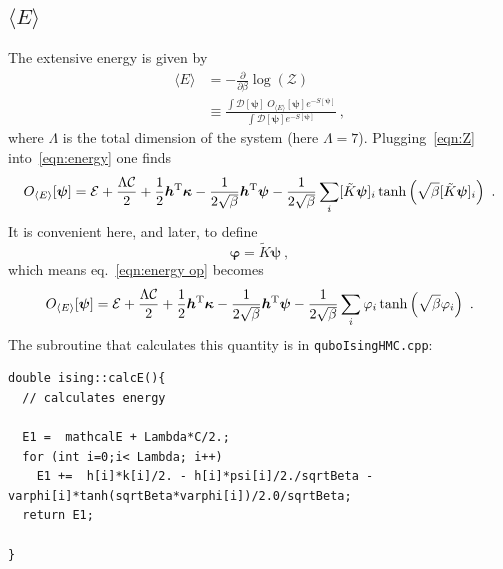 \documentclass[11pt]{article}
\begin{document}
\subsection{$\langle E\rangle$}
The extensive energy is given by
\begin{align}
\langle E\rangle&=-\frac{\partial}{\partial \beta} \log (\mathcal{Z})\label{eqn:energy}\\
&\equiv\frac{\int\mathcal{D}[\bm\psi]\ O_{\langle E\rangle}[\bm\psi]e^{-S[\bm\psi]}}{\int\mathcal{D}[\bm\psi]e^{-S[\bm\psi]}}\ ,
\end{align}
where $\Lambda$ is the total dimension of the system  (here $\Lambda=7$).  Plugging~\eqref{eqn:Z} into~\eqref{eqn:energy} one finds
\begin{equation}\label{eqn:energy op}
O_{\langle E\rangle}[\bm\psi]=\mathcal{E}+\frac{\Lambda\mathcal{C}}{2}
+\frac{1}{2}\bm h^{\rm T}\bm\kappa
-\frac{1}{2\sqrt{\beta}}\bm h^{\rm T}\bm\psi
-\frac{1}{2 \sqrt{\beta}} \sum_{i} [\tilde{K}\bm\psi]_i \tanh \left(\sqrt{\beta} [\tilde{K}\bm\psi]_i\right)\ .
\end{equation}
It is convenient here, and later, to define
\begin{equation}
\bm\varphi = \tilde K\bm \psi\ ,
\end{equation}
which means eq.~\eqref{eqn:energy op} becomes
\begin{equation}\label{eqn:energy op2}
O_{\langle E\rangle}[\bm\psi]=\mathcal{E}+\frac{\Lambda\mathcal{C}}{2}
+\frac{1}{2}\bm h^{\rm T}\bm\kappa
-\frac{1}{2\sqrt{\beta}}\bm h^{\rm T}\bm\psi
-\frac{1}{2 \sqrt{\beta}} \sum_{i} \varphi_i \tanh \left(\sqrt{\beta} \varphi_i\right)\ .
\end{equation}
The subroutine that calculates this quantity is in \texttt{quboIsingHMC.cpp}:
{\tiny
\begin{lstlisting}
double ising::calcE(){
  // calculates energy

  E1 =  mathcalE + Lambda*C/2.;
  for (int i=0;i< Lambda; i++)
    E1 +=  h[i]*k[i]/2. - h[i]*psi[i]/2./sqrtBeta - varphi[i]*tanh(sqrtBeta*varphi[i])/2.0/sqrtBeta;
  return E1;
    
}
\end{lstlisting}
}
\end{document}
